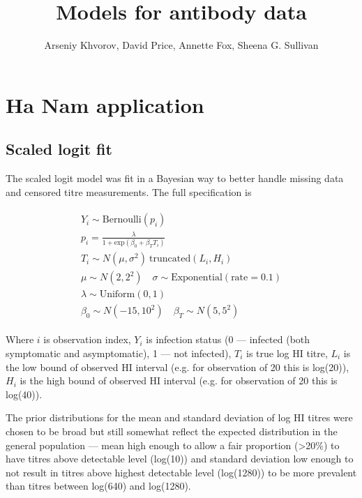 \documentclass[12pt]{article}
\title{Models for antibody data}
\author{Arseniy Khvorov, David Price, Annette Fox, Sheena G. Sullivan}
\begin{document}
\maketitle


\section{Ha Nam application}

\subsection{Scaled logit fit}

The scaled logit model was fit in a Bayesian way to better handle missing data and censored titre measurements. The full specification is

\begin{align*}
\begin{gathered}
Y_i \sim \text{Bernoulli}(p_i) \\
p_i = \frac{\lambda}{1 + \text{exp}(\beta_0 + \beta_T T_i)} \\
T_i \sim N(\mu, \sigma^2) \ \text{truncated}(L_{i}, H_{i}) \\
\mu \sim N(2, 2^2) \quad \sigma \sim \text{Exponential}(\text{rate} = 0.1) \\
\lambda \sim \text{Uniform}(0, 1) \\
\beta_0 \sim N(-15, 10^2) \quad \beta_T \sim N(5, 5^2)
\end{gathered}
\end{align*}

Where $i$ is observation index, $Y_i$ is infection status (0 --- infected (both symptomatic and asymptomatic), 1 --- not infected), $T_i$ is true log HI titre, $L_i$ is the low bound of observed HI interval (e.g. for observation of 20 this is log(20)), $H_i$ is the high bound of observed HI interval (e.g. for observation of 20 this is log(40)).

The prior distributions for the mean and standard deviation of log HI titres were chosen to be broad but still somewhat reflect the expected distribution in the general population --- mean high enough to allow a fair proportion (>20\%) to have titres above detectable level (log(10)) and standard deviation low enough to not result in titres above highest detectable level (log(1280)) to be more prevalent than titres between log(640) and log(1280).
\end{document}
